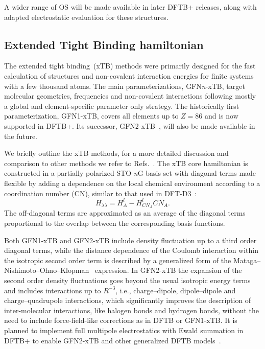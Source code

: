 \documentclass[reprint,onecolumn,superscriptaddress]{revtex4-1}
\newcommand{\dftbp}{DFTB+}
\begin{document}
A wider range of OS will be made available in later \dftbp{}
releases, along with adapted electrostatic evaluation for these structures.

\subsection{Extended Tight Binding hamiltonian}

The extended tight binding~(xTB) methods were primarily designed for the fast
calculation of structures and non-covalent interaction energies for finite
systems with a few thousand atoms. The main parameterizations, GFN\textit n-xTB,
target molecular geometries, frequencies and non-covalent interactions following
mostly a global and element-specific parameter only strategy. The historically
first parameterization, GFN1-xTB, covers all elements up to $Z=86$ and is now
supported in \dftbp{}. Its successor, GFN2-xTB~\cite{bannwarth2019}, will also be
made available in the future.

We briefly outline the xTB methods, for a more detailed discussion and
comparison to other methods we refer to
Refs.~\cite{grimme2017,bannwarth2019}.  The xTB core hamiltonian is
constructed in a partially polarized STO-\textit nG basis set with diagonal
terms made flexible by adding a dependence on the local chemical environment
according to a coordination number (CN), similar to that used in
DFT-D3~\cite{grimme2010}:
%
\begin{equation}
  H_{\lambda\lambda} = H^l_A - H^l_{{CN}_{A}} {CN}_{A}.
\end{equation}
%
The off-diagonal terms are approximated as an average of the diagonal terms
proportional to the overlap between the corresponding basis functions.

Both GFN1-xTB and GFN2-xTB include density fluctuation up to a third order
diagonal terms, while the distance dependence of the Coulomb interaction within
the isotropic second order term is described by a generalized form of the
Mataga--Nishimoto--Ohno--Klopman~\cite{klopman1964,ohno1964,mataga1957}
expression. In GFN2-xTB the expansion of the second order density fluctuations
goes beyond the usual isotropic energy terms and includes interactions up to
$R^{-3}$, i.e., charge--dipole, dipole--dipole and charge--quadrupole
interactions, which significantly improves the description of inter-molecular
interactions, like halogen bonds and hydrogen bonds, without the need to
include force-field-like corrections as in DFTB or GFN1-xTB. It is planned to implement full multipole electrostatics with Ewald summation
in \dftbp{} to enable GFN2-xTB and other generalized DFTB
models~\cite{Bodrog2012}.
\end{document}
